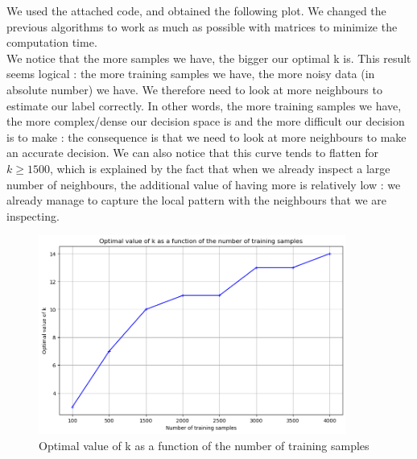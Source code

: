 \documentclass[final,3p,times,12pt]{article}
\begin{document}
\begin{enumerate}
        We used the attached code, and obtained the following plot. We changed the previous algorithms to work as much as possible with matrices to minimize the computation time.\\

        We notice that the more samples we have, the bigger our optimal k is. This result seems logical : the more training samples we have, the more noisy data (in absolute number) we have. We therefore need to look at more neighbours to estimate our label correctly. In other words, the more training samples we have, the more complex/dense our decision space is and the more difficult our decision is to make : the consequence is that we need to look at more neighbours to make an accurate decision. We can also notice that this curve tends to flatten for $k\geq1500$, which is explained by the fact that when we already inspect a large number of neighbours, the additional value of having more is relatively low : we already manage to capture the local pattern with the neighbours that we are inspecting. \\


        \begin{figure}[H] %
            \centering %
            \includegraphics[width=0.9\textwidth]{images/image_part2_3.png}
            \caption{Optimal value of k as a function of the number of training samples} %
            \label{fig:image1} %
        \end{figure}
\end{enumerate}
\end{document}
